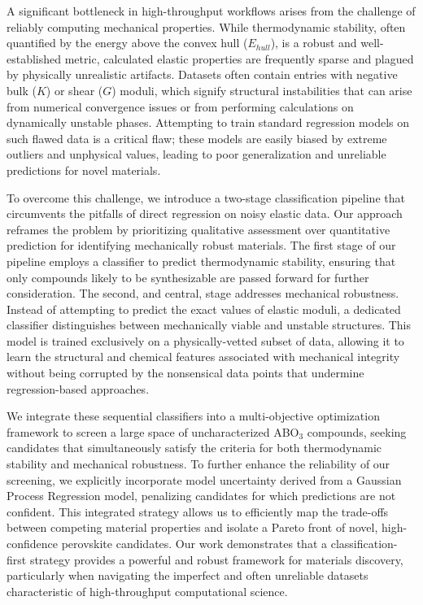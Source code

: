 \documentclass[]{article}
\begin{document}
A significant bottleneck in high-throughput workflows arises from the challenge of reliably computing mechanical properties. While thermodynamic stability, often quantified by the energy above the convex hull ($E_{hull}$), is a robust and well-established metric, calculated elastic properties are frequently sparse and plagued by physically unrealistic artifacts. Datasets often contain entries with negative bulk ($K$) or shear ($G$) moduli, which signify structural instabilities that can arise from numerical convergence issues or from performing calculations on dynamically unstable phases. Attempting to train standard regression models on such flawed data is a critical flaw; these models are easily biased by extreme outliers and unphysical values, leading to poor generalization and unreliable predictions for novel materials.

To overcome this challenge, we introduce a two-stage classification pipeline that circumvents the pitfalls of direct regression on noisy elastic data. Our approach reframes the problem by prioritizing qualitative assessment over quantitative prediction for identifying mechanically robust materials. The first stage of our pipeline employs a classifier to predict thermodynamic stability, ensuring that only compounds likely to be synthesizable are passed forward for further consideration. The second, and central, stage addresses mechanical robustness. Instead of attempting to predict the exact values of elastic moduli, a dedicated classifier distinguishes between mechanically viable and unstable structures. This model is trained exclusively on a physically-vetted subset of data, allowing it to learn the structural and chemical features associated with mechanical integrity without being corrupted by the nonsensical data points that undermine regression-based approaches.

We integrate these sequential classifiers into a multi-objective optimization framework to screen a large space of uncharacterized ABO$_3$ compounds, seeking candidates that simultaneously satisfy the criteria for both thermodynamic stability and mechanical robustness. To further enhance the reliability of our screening, we explicitly incorporate model uncertainty derived from a Gaussian Process Regression model, penalizing candidates for which predictions are not confident. This integrated strategy allows us to efficiently map the trade-offs between competing material properties and isolate a Pareto front of novel, high-confidence perovskite candidates. Our work demonstrates that a classification-first strategy provides a powerful and robust framework for materials discovery, particularly when navigating the imperfect and often unreliable datasets characteristic of high-throughput computational science.
\end{document}
